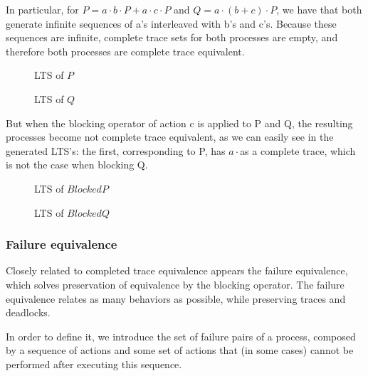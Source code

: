 \documentclass[11pt]{article}
\newcommand{\cmark}{\ding{51}}
\theoremstyle{definition}
\theoremstyle{plain}
\begin{document}
In particular, for $ P = a\cdot b\cdot P + a\cdot c\cdot P $ and $ Q = a\cdot (b+c)\cdot P $, we have that both generate infinite sequences of a's interleaved with b's and c's. Because these sequences are infinite, complete trace sets for both processes are empty, and therefore both processes are complete trace equivalent.

\begin{figure} [H]
	\centering
	
	\caption{LTS of $P$} \label{fig:CompleteTraceEquivalenceP}
	\endminipage\hfill
	\centering
	
	\caption{LTS of $Q$} \label{fig:CompleteTraceEquivalenceQ}
	\endminipage\hfill
\end{figure}

But when the blocking operator of action c is applied to P and Q, the resulting processes become not complete trace equivalent, as we can easily see in the generated LTS's: the first, corresponding to P, has $ a\cdot $\cmark as a complete trace, which is not the case when blocking Q.

\begin{figure} [H]
	\centering
	
	\caption{LTS of $Blocked P$} \label{fig:CompleteTraceEquivalenceBlockedP}
	\endminipage\hfill
	\centering
	
	\caption{LTS of $Blocked Q$} \label{fig:CompleteTraceEquivalenceBlockedQ}
	\endminipage\hfill
\end{figure}

\subsubsection{Failure equivalence}
Closely related to completed trace equivalence appears the failure equivalence, which solves preservation of equivalence by the blocking operator. The failure equivalence relates as many behaviors as possible, while preserving traces and deadlocks.

In order to define it, we introduce the set of failure pairs of a process, composed by a sequence of actions and some set of actions that (in some cases) cannot be performed after executing this sequence.
\end{document}
